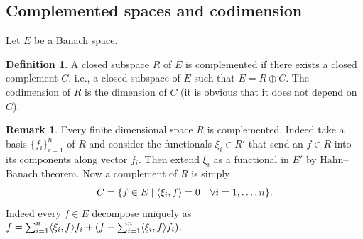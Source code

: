 \documentclass[a4paper,11pt]{article}
\theoremstyle{definition}
\newtheorem{defi}[prop]{Definition}
\newtheorem{rmk}[prop]{Remark}
\DeclarePairedDelimiter{\dual}{\langle}{\rangle}
\begin{document}
\subsection{Complemented spaces and codimension}

Let $E$ be a Banach space.
\begin{defi}
A closed subspace $R$ of $E$ is complemented if there exists a closed complement $C$, i.e., a closed subspace of $E$ such that $E=R\oplus C$. The codimension of $R$ is the dimension of $C$ (it is obvious that it does not depend on $C$).
\end{defi}
\begin{rmk}
Every finite dimensional space $R$ is complemented. Indeed take a basis $\{f_i\}_{i=1}^n$ of $R$ and consider the functionals $\xi_i\in R'$ that send an $f\in R$ into its components along vector $f_i$. Then extend $\xi_i$ as a functional in $E'$ by Hahn--Banach theorem. Now a complement of $R$ is simply
\[
C=\{f\in E\;|\;\dual{\xi_i,f}=0\quad\forall i=1,\dots,n\}.
\]
Indeed every $f\in E$ decompose uniquely as $f=\sum_{i=1}^n\dual{\xi_i,f}f_i+(f-\sum_{i=1}^n\dual{\xi_i,f}f_i)$.
\end{rmk}
\end{document}
